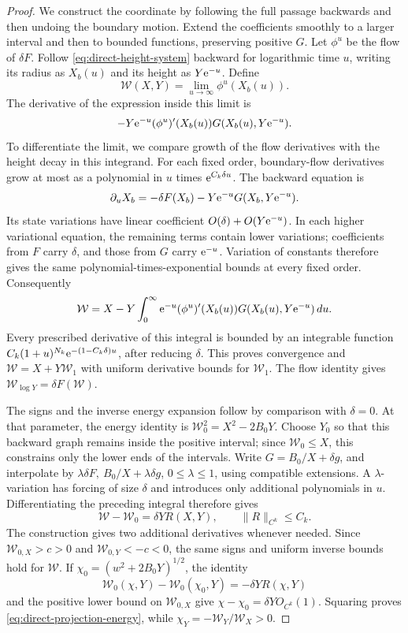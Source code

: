 \begin{proof}
We construct the coordinate by following the full passage backwards and
then undoing the boundary motion. Extend the coefficients smoothly to a
larger interval and then to bounded functions, preserving positive \(G\). Let \(\phi^u\)
be the flow of \(\delta F\). Follow
\eqref{eq:direct-height-system} backward for logarithmic time \(u\),
writing its radius as \(X_b(u)\) and its height as \(Y\mathrm e^{-u}\).
Define
\[
 \mathcal W(X,Y)=\lim_{u\to\infty}\phi^u(X_b(u)).
\]
The derivative of the expression inside this limit is
\begin{equation}
\label{eq:direct-projection-integrand}
 -Y\mathrm e^{-u}(\phi^u)'(X_b(u))G(X_b(u),Y\mathrm e^{-u}).
\end{equation}
To differentiate the limit, we compare growth of the flow derivatives
with the height decay in this integrand. For each fixed order,
boundary-flow derivatives grow at most as
a polynomial in \(u\) times \(\mathrm e^{C_k\delta u}\).
The backward equation is
\[
 \partial_uX_b=-\delta F(X_b)-Y\mathrm e^{-u}G(X_b,Y\mathrm e^{-u}).
\]
Its state variations have linear coefficient
\(O(\delta)+O(Y\mathrm e^{-u})\). In each higher variational equation,
the remaining terms contain lower variations; coefficients from
\(F\) carry \(\delta\), and those from \(G\) carry \(\mathrm e^{-u}\).
Variation of constants therefore gives the same
polynomial-times-exponential bounds at every fixed order.
Consequently
\[
 \mathcal W=X-Y\int_0^\infty \mathrm e^{-u}
       (\phi^u)'(X_b(u))G(X_b(u),Y\mathrm e^{-u})\,du.
\]
Every prescribed derivative of this integral is bounded by an
integrable function
\(C_k(1+u)^{N_k}\mathrm e^{-(1-C_k\delta)u}\), after reducing
\(\delta\). This proves convergence and \(\mathcal W=X+Y\mathcal W_1\)
with uniform derivative bounds for \(\mathcal W_1\).
The flow identity gives \(\mathcal W_{\log Y}=\delta F(\mathcal W)\).

The signs and the inverse energy expansion follow by comparison with
\(\delta=0\). At that parameter, the energy identity is
\(\mathcal W_0^2=X^2-2B_0Y\). Choose \(Y_0\) so that this backward
graph remains inside the positive interval; since \(\mathcal W_0\le X\), this
constrains only the lower ends of the intervals. Write
\(G=B_0/X+\delta g\), and interpolate by
\(\lambda\delta F,\ B_0/X+\lambda\delta g\), \(0\le\lambda\le1\),
using compatible extensions. A \(\lambda\)-variation has
forcing of size \(\delta\) and introduces only additional
polynomials in \(u\). Differentiating the preceding integral
therefore gives
\[
 \mathcal W-\mathcal W_0=\delta YR(X,Y),\qquad \|R\|_{C^k}\le C_k.
\]
The construction gives two additional derivatives whenever needed.
Since \(\mathcal W_{0,X}>c>0\) and
\(\mathcal W_{0,Y}<-c<0\), the same signs and uniform inverse bounds
hold for \(\mathcal W\). If \(\chi_0=(w^2+2B_0Y)^{1/2}\), the identity
\[
 \mathcal W_0(\chi,Y)-\mathcal W_0(\chi_0,Y)=-\delta YR(\chi,Y)
\]
and the positive lower bound on \(\mathcal W_{0,X}\) give
\(\chi-\chi_0=\delta YO_{C^k}(1)\).
Squaring proves \eqref{eq:direct-projection-energy}, while
\(\chi_Y=-\mathcal W_Y/\mathcal W_X>0\).
\end{proof}

